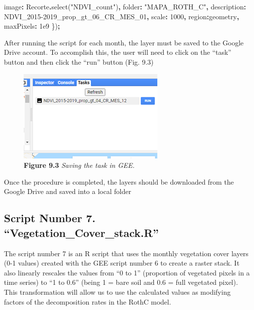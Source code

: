 \documentclass[
  10pt,
  b5paper,
]{book}
\newenvironment{Shaded}{\begin{snugshade}}{\end{snugshade}}
\newcommand{\DataTypeTok}[1]{\textcolor[rgb]{0.13,0.29,0.53}{#1}}
\newcommand{\DecValTok}[1]{\textcolor[rgb]{0.00,0.00,0.81}{#1}}
\newcommand{\FloatTok}[1]{\textcolor[rgb]{0.00,0.00,0.81}{#1}}
\newcommand{\FunctionTok}[1]{\textcolor[rgb]{0.00,0.00,0.00}{#1}}
\newcommand{\NormalTok}[1]{#1}
\newcommand{\OperatorTok}[1]{\textcolor[rgb]{0.81,0.36,0.00}{\textbf{#1}}}
\newcommand{\StringTok}[1]{\textcolor[rgb]{0.31,0.60,0.02}{#1}}
\begin{document}
\begin{Shaded}
\begin{Highlighting}[]
          \DataTypeTok{image}\OperatorTok{:}\NormalTok{ Recorte}\OperatorTok{.}\FunctionTok{select}\NormalTok{(}\StringTok{"NDVI\_count"}\NormalTok{)}\OperatorTok{,}
          \DataTypeTok{folder}\OperatorTok{:} \StringTok{"MAPA\_ROTH\_C"}\OperatorTok{,}
          \DataTypeTok{description}\OperatorTok{:} \StringTok{\textquotesingle{}NDVI\_2015{-}2019\_prop\_gt\_06\_CR\_MES\_01\textquotesingle{}}\OperatorTok{,} 
          \DataTypeTok{scale}\OperatorTok{:} \DecValTok{1000}\OperatorTok{,}
          \DataTypeTok{region}\OperatorTok{:}\NormalTok{geometry}\OperatorTok{,}
          \DataTypeTok{maxPixels}\OperatorTok{:} \FloatTok{1e9}     
\NormalTok{\})}\OperatorTok{;}
\end{Highlighting}
\end{Shaded}

After running the script for each month, the layer must be saved to the Google Drive account. To accomplish this, the user will need to click on the ``task'' button and then click the ``run'' button (Fig. 9.3)

\begin{figure}
\centering
\includegraphics{images/Figure_9.3.png}
\caption{\textbf{Figure 9.3} \emph{Saving the task in GEE.}}
\end{figure}

Once the procedure is completed, the layers should be downloaded from the Google Drive and saved into a local folder

\hypertarget{script-number-7.-vegetation_cover_stack.r}{%
\subsection{Script Number 7. ``Vegetation\_Cover\_stack.R''}\label{script-number-7.-vegetation_cover_stack.r}}

The script number 7 is an R script that uses the monthly vegetation cover layers (0-1 values) created with the GEE script number 6 to create a raster stack. It also linearly rescales the values from ``0 to 1'' (proportion of vegetated pixels in a time series) to ``1 to 0.6'' (being 1 = bare soil and 0.6 = full vegetated pixel). This transformation will allow us to use the calculated values as modifying factors of the decomposition rates in the RothC model.
\end{document}
